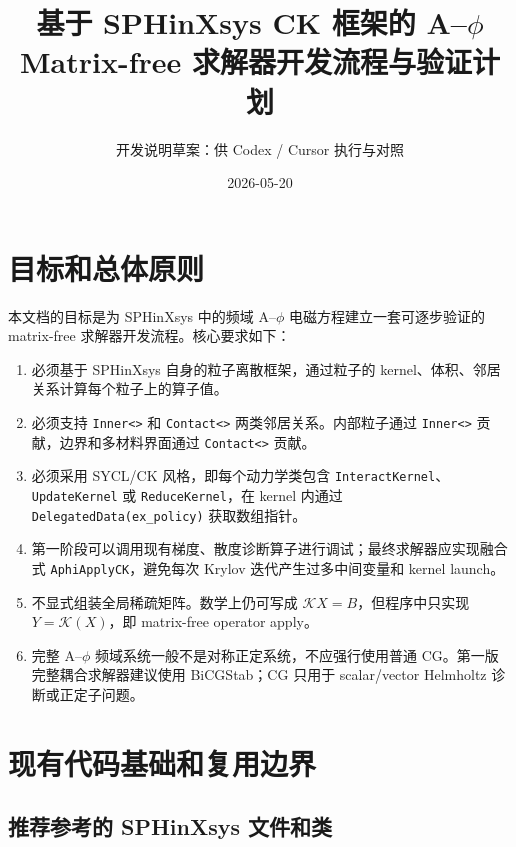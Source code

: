 \documentclass[UTF8,a4paper,11pt]{ctexart}
\title{基于 SPHinXsys CK 框架的 A--\texorpdfstring{$\phi$}{phi} Matrix-free 求解器开发流程与验证计划}
\author{开发说明草案：供 Codex / Cursor 执行与对照}
\date{2026-05-20}
\newcommand{\code}[1]{\texttt{#1}}
\newcommand{\Kop}{\mathcal K}
\begin{document}
\maketitle

\section{目标和总体原则}

本文档的目标是为 SPHinXsys 中的频域 A--$\phi$ 电磁方程建立一套可逐步验证的 matrix-free 求解器开发流程。核心要求如下：

\begin{enumerate}
  \item 必须基于 SPHinXsys 自身的粒子离散框架，通过粒子的 kernel、体积、邻居关系计算每个粒子上的算子值。
  \item 必须支持 \code{Inner<>} 和 \code{Contact<>} 两类邻居关系。内部粒子通过 \code{Inner<>} 贡献，边界和多材料界面通过 \code{Contact<>} 贡献。
  \item 必须采用 SYCL/CK 风格，即每个动力学类包含 \code{InteractKernel}、\code{UpdateKernel} 或 \code{ReduceKernel}，在 kernel 内通过 \code{DelegatedData(ex\_policy)} 获取数组指针。
  \item 第一阶段可以调用现有梯度、散度诊断算子进行调试；最终求解器应实现融合式 \code{AphiApplyCK}，避免每次 Krylov 迭代产生过多中间变量和 kernel launch。
  \item 不显式组装全局稀疏矩阵。数学上仍可写成 $\Kop X=B$，但程序中只实现 $Y=\Kop(X)$，即 matrix-free operator apply。
  \item 完整 A--$\phi$ 频域系统一般不是对称正定系统，不应强行使用普通 CG。第一版完整耦合求解器建议使用 BiCGStab；CG 只用于 scalar/vector Helmholtz 诊断或正定子问题。
\end{enumerate}

\section{现有代码基础和复用边界}

\subsection{推荐参考的 SPHinXsys 文件和类}
\end{document}
